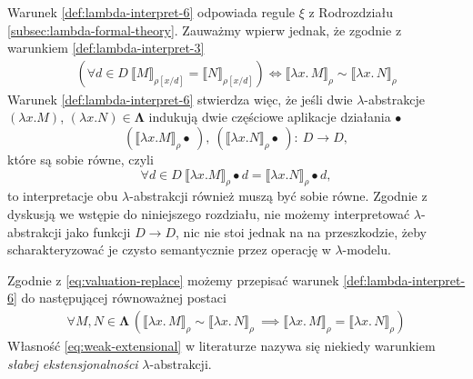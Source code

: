 Warunek \ref{def:lambda-interpret-6} odpowiada regule \(\xi\) z Rodrozdziału \ref{subsec:lambda-formal-theory}.
Zauważmy wpierw jednak, że zgodnie z warunkiem \ref{def:lambda-interpret-3}
\begin{align*}
  (\forall d\in D\ \llbracket M \rrbracket_{\rho[x/d]}=\llbracket N \rrbracket_{\rho[x/d]})
\iff
\llbracket\lambda x.\,M\rrbracket_\rho \sim \llbracket \lambda x.\,N\rrbracket_\rho 
\tag{\dagger\dagger}\label{eq:valuation-replace}
\end{align*}
Warunek \ref{def:lambda-interpret-6} stwierdza więc, że jeśli dwie \(\lambda\)-abstrakcje 
\((\lambda x. M)\), \((\lambda x. N)\in\mathbf{\Lambda}\) indukują dwie częściowe aplikacje działania \(\bullet\)
\[(\llbracket \lambda x. M \rrbracket_\rho\bullet\ ),\ (\llbracket \lambda x. N \rrbracket_\rho\bullet\ ):\: D\to D,\]
które są sobie równe, czyli
\[
\forall d\in D\ \llbracket \lambda x. M \rrbracket_\rho\bullet d = \llbracket \lambda x. N \rrbracket_\rho\bullet d,
\]
to interpretacje obu \(\lambda\)-abstrakcji również muszą być sobie równe. Zgodnie z dyskusją we wstępie do niniejszego rozdziału,
nie możemy interpretować \(\lambda\)-abstrakcji jako funkcji \(D\to D\), nic nie stoi jednak na na przeszkodzie, żeby scharakteryzować je  
czysto semantycznie przez operację w \(\lambda\)-modelu.




Zgodnie z \eqref{eq:valuation-replace} możemy przepisać warunek \ref{def:lambda-interpret-6} do następującej równoważnej postaci
  \begin{align}
    \forall M,N\in\mathbf{\Lambda}\,\left(\llbracket\lambda x.\,M\rrbracket_\rho \sim \llbracket \lambda x.\,N\rrbracket_\rho\ \implies \llbracket \lambda x.\,M\rrbracket_\rho = \llbracket \lambda x.\,N\rrbracket_\rho\right)\tag{vi'}\label{eq:weak-extensional}
    \end{align}  
Własność \eqref{eq:weak-extensional} w literaturze nazywa się niekiedy warunkiem \emph{słabej ekstensjonalności} \(\lambda\)-abstrakcji.

